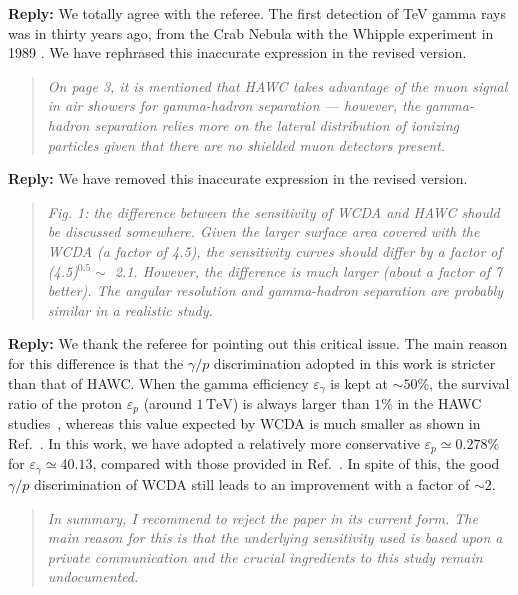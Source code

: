 \documentclass{article}
\def\TeV{\mathrm{TeV}} %
\begin{document}
\textbf{Reply:} We totally agree with the referee. The first detection of TeV gamma rays was in thirty years ago, from the Crab Nebula with the Whipple experiment in 1989 \cite{Weekes:1989tc}. We have rephrased this inaccurate expression in the revised version.

\begin{quote}
\emph{On page 3, it is mentioned that HAWC takes advantage of the muon signal in air showers for gamma-hadron separation --- however, the gamma-hadron separation relies more on the lateral distribution of ionizing particles given that there are no shielded muon detectors present.}
\end{quote}

\textbf{Reply:} We have removed this inaccurate expression in the revised version.

\begin{quote}
\emph{Fig. 1: the difference between the sensitivity of WCDA and HAWC should be discussed somewhere. Given the larger surface area covered with the WCDA (a factor of 4.5), the sensitivity curves should differ by a factor of (4.5)$^{0.5}\sim$ 2.1. However, the difference is much larger (about a factor of 7 better). The angular resolution and gamma-hadron separation are probably similar in a realistic study.}
\end{quote}

\textbf{Reply:} We thank the referee for pointing out this critical issue.
The main reason for this difference is that the $\gamma/p$ discrimination adopted in this work is stricter than that of HAWC.
When the gamma efficiency $\varepsilon_\gamma$ is kept at $\sim50\%$, the survival ratio of the proton $\varepsilon_p$ (around $1\,\TeV$) is always larger than $1\%$ in the HAWC studies~\cite{Capistran:2015dua,Abeysekara:2017mjj}, whereas this value expected by WCDA is much smaller as shown in Ref.~\cite{Zha:2017vcs}.
In this work, we have adopted a relatively more conservative $\varepsilon_p \simeq 0.278\%$ for $\varepsilon_{\gamma} \simeq 40.13$, compared with those provided in Ref.~\cite{Zha:2017vcs}. In spite of this, the good $\gamma/p$ discrimination of WCDA still leads to an improvement with a factor of $\sim2$.

\begin{quote}
\emph{In summary, I recommend to reject the paper in its current form. The main reason for this is that the underlying sensitivity used is based upon a private communication and the crucial ingredients to this study remain undocumented. }
\end{quote}
\end{document}
